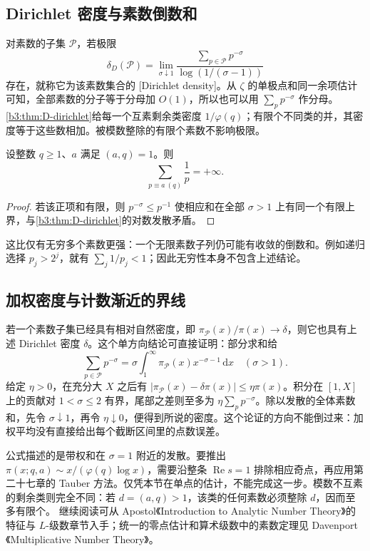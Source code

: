 \subsection{Dirichlet 密度与素数倒数和}
\label{b3:subsec:D0402}

对素数的子集 \(\mathcal P\)，若极限
\[
 \delta_D(\mathcal P)=\lim_{\sigma\downarrow1}
 \frac{\sum_{p\in\mathcal P}p^{-\sigma}}{\log(1/(\sigma-1))}
\]
存在，就称它为该素数集合的 [Dirichlet density]。从 \(\zeta\) 的单极点和同一余项估计可知，全部素数的分子等于分母加 \(O(1)\)，所以也可以用 \(\sum_p p^{-\sigma}\) 作分母。\cref{b3:thm:D-dirichlet}给每一个互素剩余类密度 \(1/\varphi(q)\)；有限个不同类的并，其密度等于这些数相加。被模数整除的有限个素数不影响极限。

\begin{corollary}[互素剩余类中的倒数发散]\label{b3:cor:D-reciprocal-divergence}
设整数 \(q\ge1\)、\(a\) 满足 \((a,q)=1\)。则
\[
 \sum_{p\equiv a\ (q)}\frac1p=+\infty.
\]
\end{corollary}
\begin{proof}
若该正项和有限，则 \(p^{-\sigma}\le p^{-1}\) 使相应和在全部 \(\sigma>1\) 上有同一个有限上界，与\cref{b3:thm:D-dirichlet}的对数发散矛盾。
\end{proof}
这比仅有无穷多个素数更强：一个无限素数子列仍可能有收敛的倒数和。例如递归选择 \(p_j>2^j\)，就有 \(\sum_j1/p_j<1\)；因此无穷性本身不包含上述结论。

\subsection{加权密度与计数渐近的界线}
\label{b3:subsec:D0403}

若一个素数子集已经具有相对自然密度，即 \(\pi_{\mathcal P}(x)/\pi(x)\to\delta\)，则它也具有上述 Dirichlet 密度 \(\delta\)。这个单方向结论可直接证明：部分求和给
\[
 \sum_{p\in\mathcal P}p^{-\sigma}
   =\sigma\int_1^\infty\pi_{\mathcal P}(x)x^{-\sigma-1}\,\mathrm{d}x
 \quad(\sigma>1).
\]
给定 \(\eta>0\)，在充分大 \(X\) 之后有
\(|\pi_{\mathcal P}(x)-\delta\pi(x)|\le\eta\pi(x)\)。积分在 \([1,X]\) 上的贡献对 \(1<\sigma\le2\) 有界，尾部之差则至多为 \(\eta\sum_pp^{-\sigma}\)。除以发散的全体素数和，先令 \(\sigma\downarrow1\)，再令 \(\eta\downarrow0\)，便得到所说的密度。这个论证的方向不能倒过来：加权平均没有直接给出每个截断区间里的点数误差。

公式描述的是带权和在 \(\sigma=1\) 附近的发散。要推出 \(\pi(x;q,a)\sim x/(\varphi(q)\log x)\)，需要沿整条 \(\operatorname{Re}s=1\) 排除相应奇点，再应用第二十七章的 Tauber 方法。仅凭本节在单点的估计，不能完成这一步。模数不互素的剩余类则完全不同：若 \(d=(a,q)>1\)，该类的任何素数必须整除 \(d\)，因而至多有限个。
\ProseParagraphBreak
继续阅读可从 Apostol《Introduction to Analytic Number Theory》的特征与 \(L\)-级数章节\cite{Apostol1976Introduction}入手；统一的零点估计和算术级数中的素数定理见 Davenport《Multiplicative Number Theory》\cite{Davenport1980Multiplicative}。

